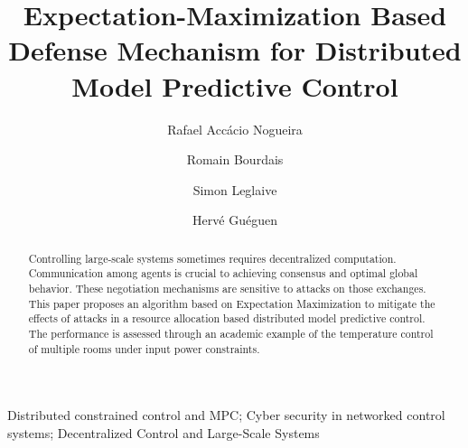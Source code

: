 \documentclass{ifacconf}  %
\begin{document}
\begin{frontmatter}
\title{\LARGE \bf
  Expectation-Maximization Based Defense Mechanism for Distributed Model Predictive Control
}

\author[First]{Rafael Accácio Nogueira}
\author[First]{Romain Bourdais}
\author[First]{Simon Leglaive}
\author[First]{Hervé Guéguen}
\address[First]{IETR-CentraleSupélec, 35510 Cesson-Sévigné, Ille-et-Vilaine, France\\
{\tt\small \{rafael-accacio.nogueira, romain.bourdais, simon.leglaive, herve.gueguen\}
@centralesupelec.fr}}




\begin{abstract}%
  Controlling large-scale systems sometimes requires decentralized computation.
  Communication among agents is crucial to achieving consensus and optimal global behavior.
  These negotiation mechanisms are sensitive to attacks on those exchanges.
  This paper proposes an algorithm based on Expectation Maximization to mitigate the effects of attacks in a resource allocation based distributed model predictive control.
  The performance is assessed through an academic example of the temperature control of multiple rooms under input power constraints.
\end{abstract}

\begin{keyword}
Distributed constrained control and MPC;
Cyber security in networked control systems;
Decentralized Control and Large-Scale Systems
\end{keyword}

\end{frontmatter}
\end{document}
